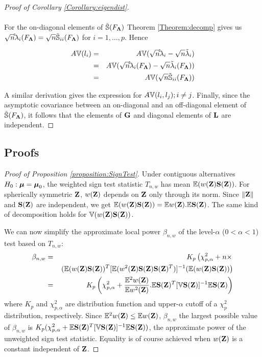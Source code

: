 \begin{proof}[Proof of Corollary \ref{Corollary:eigendist}]
\paragraph{}For the on-diagonal elements of $\tilde {{\mathbb{S}}}(F_{\boldsymbol{\Lambda}})$ Theorem \ref{Theorem:decomp} gives us $ \sqrt n \hat\tilde \lambda_i (F_{\boldsymbol{\Lambda}}) = \sqrt n {\tilde {{\mathbb{S}}}}_{ii}(F_{\boldsymbol{\Lambda}})$ for $i = 1,...,p$. Hence

\begin{eqnarray*}
A{\mathbb{V}}(l_i) &=& A{\mathbb{V}}(\sqrt n \hat\tilde \lambda_i - \sqrt n \tilde \lambda_i)\\
&=& A{\mathbb{V}}(\sqrt n \hat\tilde \lambda_i (F_{\boldsymbol{\Lambda}}) - \sqrt n \tilde \lambda_i(F_{\boldsymbol{\Lambda}}))\\
&=& A{\mathbb{V}}(\sqrt n {\tilde {{\mathbb{S}}}}_{ii}(F_{\boldsymbol{\Lambda}}))
\end{eqnarray*}

A similar derivation gives the expression for $A{\mathbb{V}}(l_i,l_j); i \neq j$. Finally, since the asymptotic covariance between an on-diagonal and an off-diagonal element of $\tilde {{\mathbb{S}}}(F_{\boldsymbol{\Lambda}})$, it follows that the elements of ${\mathbf{G}}$ and diagonal elements of ${\mathbf{L}}$ are independent.
\end{proof}

\subsection{Proofs}
\label{subsection:appC}

\begin{proof}[Proof of Proposition \ref{proposition:SignTest}]
Under contiguous alternatives $H_0: {\boldsymbol{\mu}} = {\boldsymbol{\mu}}_0$, the weighted sign test statistic $T_{n,w}$ has mean ${\mathbb{E}} (w({\mathbf{Z}}) {\mathbf{S}} ({\mathbf{Z}}))$. For spherically symmetric ${\mathbf{Z}}$, $w({\mathbf{Z}})$ depends on ${\mathbf{Z}}$ only through its norm. Since $\| {\mathbf{Z}} \|$ and ${\mathbf{S}}({\mathbf{Z}})$ are independent, we get ${\mathbb{E}} (w({\mathbf{Z}}) {\mathbf{S}} ({\mathbf{Z}})) = {\mathbb{E}} w({\mathbf{Z}}). {\mathbb{E}} {\mathbf{S}} ({\mathbf{Z}})$. The same kind of decomposition holds for ${\mathbb{V}}(w({\mathbf{Z}}) {\mathbf{S}}({\mathbf{Z}}))$.

We can now simplify the approximate local power $\beta_{n,w}$ of the level-$\alpha$ ($0 < \alpha < 1$) test based on $T_{n,w}$:
%
\begin{eqnarray*}
\beta_{n,w} &=& K_p \left( \chi^2_{p,\alpha} + n \times \right.\\
&& \left.  ({\mathbb{E}} (w({\mathbf{Z}}) {\mathbf{S}} ({\mathbf{Z}}))^T [ {\mathbb{E}} (w^2({\mathbf{Z}}) {\mathbf{S}} ({\mathbf{Z}}) {\mathbf{S}} ({\mathbf{Z}})^T) ]^{-1} ({\mathbb{E}} (w({\mathbf{Z}}) {\mathbf{S}} ({\mathbf{Z}})) \right)\\
&=& K_p \left( \chi^2_{p,\alpha} + \frac{{\mathbb{E}}^2 w({\mathbf{Z}})}{{\mathbb{E}} w^2({\mathbf{Z}})}. {\mathbb{E}} {\mathbf{S}}({\mathbf{Z}})^T [{\mathbb{V}} {\mathbf{S}}( {\mathbf{Z}})]^{-1} {\mathbb{E}} {\mathbf{S}}( {\mathbf{Z}}) \right)
\end{eqnarray*}
%
where $K_p$ and $\chi^2_{p,\alpha}$ are distribution function and upper-$\alpha$ cutoff of a $\chi^2_p$ distribution, respectively. Since ${\mathbb{E}}^2 w({\mathbf{Z}}) \leq {\mathbb{E}} w({\mathbf{Z}})$, $\beta_{n,w}$ the largest possible value of $\beta_{n,w}$ is $K_p ( \chi^2_{p,\alpha} + {\mathbb{E}}{\mathbf{S}}({\mathbf{Z}})^T [{\mathbb{V}} {\mathbf{S}}({\mathbf{Z}})]^{-1} {\mathbb{E}}{\mathbf{S}}({\mathbf{Z}}) )$, the approximate power of the unweighted sign test statistic. Equality is of course achieved when $w({\mathbf{Z}})$ is a constant independent of ${\mathbf{Z}}$.
\end{proof}

